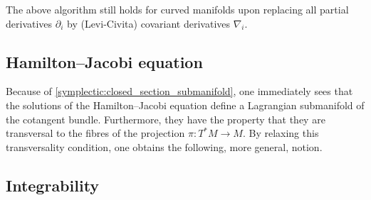     \begin{remark}
        The above algorithm still holds for curved manifolds upon replacing all partial derivatives $\partial_i$ by (Levi-Civita) covariant derivatives $\nabla_i$.
    \end{remark}

\subsection{Hamilton--Jacobi equation}\label{section:hamilton_jacobi}


    Because of \cref{symplectic:closed_section_submanifold}, one immediately sees that the solutions of the Hamilton--Jacobi equation define a Lagrangian submanifold of the cotangent bundle. Furthermore, they have the property that they are transversal to the fibres of the projection $\pi:T^*M\rightarrow M$. By relaxing this transversality condition, one obtains the following, more general, notion.

\subsection{Integrability}\label{section:integrability}

